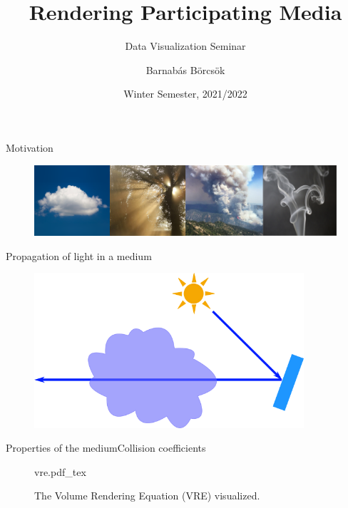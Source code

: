 \documentclass[
  english,            %
  aspectratio=169,    %
]{tumbeamer}
\title{Rendering Participating Media}
\subtitle{Data Visualization Seminar}
\author{Barnabás Börcsök}
\institute{\theChairName\\\theDepartmentName\\\theUniversityName}
\date[WS 2021/2022]{Winter Semester, 2021/2022}
\newcommand{\incfig}[1]{%
    \def\svgwidth{\columnwidth}
    {#1.pdf_tex}
}
\begin{document}
\maketitle

\begin{frame}{Motivation}
  \begin{figure}
      \centering
      \includegraphics{img/teaser.png}
      \label{fig:teaser}
  \end{figure}
\end{frame}

\begin{frame}{Propagation of light in a medium}
    \begin{figure}[ht]
        \centering
        \def\svgwidth{\columnwidth}
        \includegraphics[width=10cm]{img/propagation-illustration.png}
    \end{figure}
\end{frame}

\begin{frame}{Properties of the medium}{Collision coefficients}
\begin{figure}[ht]
    \centering
    \incfig{vre}
    \caption{The Volume Rendering Equation (VRE) visualized.}
    \label{fig:vre}
\end{figure}\end{frame}
\end{document}

